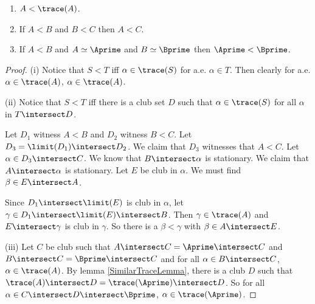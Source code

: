\documentclass[oneside,12pt]{amsart}
\begin{document}
\begin{lemma}
\mbox{}
\begin{enumerate}
\item[(i)] $A<\trace(A)$.
\item[(ii)] If $A<B$ and $B<C$ then $A<C$.
\item[(iii)] If $A<B$ and $A\simeq \Aprime$ and $B\simeq \Bprime$ then
$\Aprime<\Bprime$.
\end{enumerate}
\end{lemma}
\begin{proof}
(i) Notice that $S<T$ iff $\alpha\in\trace(S)$ for a.e. $\alpha \in T$. Then clearly for a.e.
$\alpha\in\trace(A)$, $\alpha\in\trace(A)$.

(ii) Notice that $S<T$ iff there is a club set $D$ such that $\alpha\in\trace(S)$ for all
$\alpha$ in $T\intersect D$.

Let $D_1$ witness $A<B$ and $D_2$ witness $B < C$.
Let $D_3=\limit(D_1) \intersect D_2$.
We claim that $D_3$ witnesses that $A<C$. Let $\alpha\in D_3 \intersect C$. We know
that $B\intersect \alpha$ is stationary. We claim that
$A\intersect \alpha$ is stationary. Let $E$ be club in $\alpha$. We must find
$\beta\in E\intersect A$.

Since $D_1 \intersect\limit(E)$ is club in $\alpha$, let
$\gamma\in D_1 \intersect \limit(E) \intersect B$.
Then $\gamma\in\trace(A)$ and $E\intersect\gamma$ is club in $\gamma$. So there
is a $\beta<\gamma$ with $\beta\in A\intersect E$.

(iii) Let $C$ be club such that $A\intersect C=\Aprime\intersect C$ and
$B\intersect C = \Bprime\intersect C$ and for all $\alpha\in B\intersect C$,
$\alpha\in\trace(A)$. By lemma \ref{SimilarTraceLemma}, there is a club $D$ such that
$\trace(A)\intersect D = \trace(\Aprime) \intersect D$. So for all
$\alpha \in C \intersect D \intersect \Bprime$, $\alpha\in\trace(\Aprime)$.

\end{proof}
\end{document}
